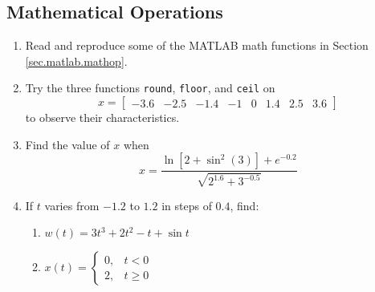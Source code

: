 \subsection{Mathematical Operations}
\begin{enumerate}
    \item Read and reproduce some of the MATLAB math functions in Section \ref{sec.matlab.mathop}.
    \item Try the three functions \verb=round=, \verb=floor=, and \verb=ceil= on
        \begin{equation*}
        x= \left[ \begin{array}{rrrrrrrr}-3.6&-2.5&-1.4&-1&0&1.4&2.5&3.6 \end{array}\right]
        \end{equation*}
    to observe their characteristics.
    \item Find the value of $x$ when
        \begin{equation*}
        x=\frac{\ln \left[2+\sin^2(3)\right] + e^{-0.2}}{\sqrt{2^{1.6}+3^{-0.5}}}
        \end{equation*}
    \item If $t$ varies from $-1.2$ to $1.2$ in steps of $0.4$, find:
        \begin{enumerate}
        \item $w(t) = 3t^3+2t^2-t+\sin t$
        \item $x(t) = \left\{ \begin{array}{ll}0,&t<0\\2,& t\geq0 \end{array} \right.$
        \end{enumerate}
\end{enumerate}

